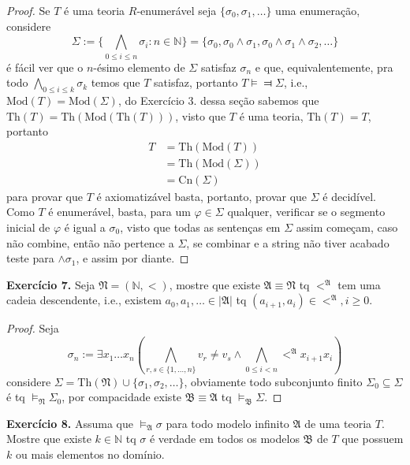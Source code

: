 \documentclass[11pt]{article}
\newcommand{\mf}[1]{\mathfrak{#1}}
\newcommand{\mbb}[1]{\mathbb{#1}}
\newcommand{\rp}[1]{{\left(#1\right)}}
\begin{document}
\begin{proof}
    Se $T$ é uma teoria $R$-enumerável seja $\{\sigma_0,\sigma_1,\dots\}$ uma enumeração, considere
    $$\Sigma:=\Biggl\{\bigwedge_{0\leq i\leq n}\sigma_i: n\in\mbb{N}\Biggr\}=\{\sigma_0,\sigma_0\wedge\sigma_1,\sigma_0\wedge\sigma_1\wedge\sigma_2,\dots\}$$
    é fácil ver que o $n$-ésimo elemento de $\Sigma$ satisfaz $\sigma_n$ e que, equivalentemente, pra todo $\bigwedge_{0\leq i\leq k}\sigma_k$ temos que $T$ satisfaz, portanto $T\vDash\Dashv\Sigma$, i.e., $\text{Mod}(T)=\text{Mod}(\Sigma)$, do Exercício 3. dessa seção sabemos que $\text{Th}(T)=\text{Th}(\text{Mod}(\text{Th}(T)))$, visto que $T$ é uma teoria, $\text{Th}(T)=T$, portanto
    \begin{align*}
        T & = \text{Th}(\text{Mod}(T))\\
        & = \text{Th}(\text{Mod}(\Sigma))\\
        & = \text{Cn}(\Sigma)
    \end{align*}
    para provar que $T$ é axiomatizável basta, portanto, provar que $\Sigma$ é decidível.\\
    Como $T$ é enumerável, basta, para um $\varphi\in\Sigma$ qualquer, verificar se o segmento inicial de $\varphi$ é igual a $\sigma_0$, visto que  todas as sentenças em $\Sigma$ assim começam, caso não combine, então não pertence a $\Sigma$, se combinar e a string não tiver acabado teste para $\wedge\sigma_1$, e assim por diante.
\end{proof}

\begin{shaded}
\textbf{Exercício 7.} Seja $\mf{N}=(\mbb{N},<)$, mostre que existe $\mf{A}\equiv\mf{N}$ tq $<^\mf{A}$ tem uma cadeia descendente, i.e., existem $a_0,a_1,\dots\in|\mf{A}|$ tq $(a_{i+1},a_i)\in<^\mf{A},i\geq0$.
\end{shaded}

\begin{proof}
    Seja
    $$\sigma_n:=\exists x_1\dots x_n\rp{\bigwedge_{r,s\in\{1,\dots,n\}}v_r\neq 
 v_s\wedge\bigwedge_{0\leq i<n}<^\mf{A}x_{i+1}x_i}$$
 considere $\Sigma=\text{Th}(\mf{N})\cup\{\sigma_1,\sigma_2,\dots\}$, obviamente todo subconjunto finito $\Sigma_0\subseteq\Sigma$ é tq $\vDash_\mf{N}\Sigma_0$, por compacidade existe $\mf{B}\equiv\mf{A}$ tq $\vDash_\mf{B}\Sigma$.
\end{proof}

\begin{shaded}
\textbf{Exercício 8.} Assuma que $\vDash_\mf{A}\sigma$ para todo modelo infinito $\mf{A}$ de uma teoria $T$. Mostre que existe $k\in\mbb{N}$ tq $\sigma$ é verdade em todos os modelos $\mf{B}$ de $T$ que possuem $k$ ou mais elementos no domínio.
\end{shaded}
\end{document}
